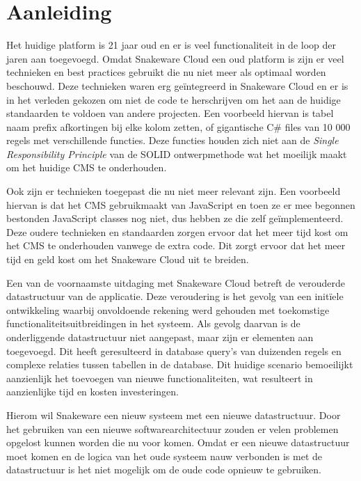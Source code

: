 \section{Aanleiding}
Het huidige platform is 21 jaar oud en er is veel functionaliteit in de loop der jaren aan toegevoegd.
Omdat Snakeware Cloud een oud platform is zijn er veel technieken en best practices gebruikt die nu niet meer als optimaal worden beschouwd.
Deze technieken waren erg geïntegreerd in Snakeware Cloud en er is in het verleden gekozen om niet de code te herschrijven om het aan de huidige standaarden te voldoen van andere projecten.
Een voorbeeld hiervan is tabel naam prefix afkortingen bij elke kolom zetten, of gigantische C\# \Parencite{CSharp} files van 10 000 regels met verschillende functies.
Deze functies houden zich niet aan de \textit{Single Responsibility Principle} van de SOLID ontwerpmethode \Parencite{SOLID} wat het moeilijk maakt om het huidige \gls{CMS} te onderhouden.

\whitespace
Ook zijn er technieken toegepast die nu niet meer relevant zijn.
Een voorbeeld hiervan is dat het \gls{CMS} gebruikmaakt van JavaScript \Parencite{JavaScript} en toen ze er mee begonnen bestonden JavaScript classes \Parencite{JavascriptClasses} nog niet, dus hebben ze die zelf geïmplementeerd.
Deze oudere technieken en standaarden zorgen ervoor dat het meer tijd kost om het CMS te onderhouden vanwege de extra code.
Dit zorgt ervoor dat het meer tijd en geld kost om het Snakeware Cloud uit te breiden.

\whitespace[2]
Een van de voornaamste uitdaging met Snakeware Cloud betreft de verouderde datastructuur van de applicatie.
Deze veroudering is het gevolg van een initïele ontwikkeling waarbij onvoldoende rekening werd gehouden met toekomstige functionaliteitsuitbreidingen in het systeem.
Als gevolg daarvan is de onderliggende datastructuur niet aangepast, maar zijn er elementen aan toegevoegd.
Dit heeft geresulteerd in database query's van duizenden regels en complexe relaties tussen tabellen in de database.
Dit huidige scenario bemoeilijkt aanzienlijk het toevoegen van nieuwe functionaliteiten, wat resulteert in aanzienlijke tijd en kosten investeringen.

\whitespace
Hierom wil Snakeware een nieuw systeem met een nieuwe datastructuur.
Door het gebruiken van een nieuwe softwarearchitectuur zouden er velen problemen opgelost kunnen worden die nu voor komen.
Omdat er een nieuwe datastructuur moet komen en de logica van het oude systeem nauw verbonden is met de datastructuur is het niet mogelijk om de oude code opnieuw te gebruiken.

